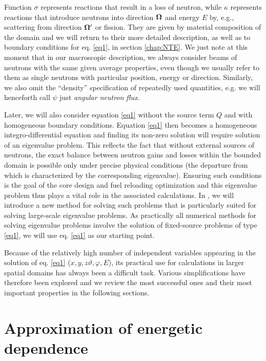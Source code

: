 Function $\sigma$ represents reactions that result in a loss of neutron, while $\kappa$ represents reactions that
introduce neutrons into direction $\mathbf{\Omega}$ and energy $E$ by, e.g., scattering from direction $\mathbf{\Omega}'$ or fission. 
They are given by material composition of the domain and we will return to their more detailed description, as
well as to boundary conditions for eq. \eqref{eq1}, in section \ref{chap:NTE}. We just note at this moment that in our macroscopic
description, we always consider beams of neutrons with the same given average properties, even though we usually refer
to them as single neutrons with particular position, energy or direction. Similarly, we also omit the ``density''
specification of repeatedly used quantities, e.g. we will henceforth call $\psi$ just \textit{angular neutron flux}.

Later, we will also consider equation \eqref{eq1} without the source term $Q$ and with homogeneous boundary conditions.
Equation \eqref{eq1} then becomes a homogeneous integro-differential equation and finding its non-zero
solution will require solution of an eigenvalue problem. This reflects the fact that without external sources of neutrons, the exact balance between neutron gains and
losses within the bounded domain is possible only under precise physical conditions (the departure from which is
characterized by the corresponding eigenvalue). Ensuring such conditions is the goal of the core design and fuel
reloading optimization and this eigenvalue problem thus plays a vital role in the associated calculations. In
, we will introduce a new method for solving such problems that is particularly suited for solving
large-scale eigenvalue problems. As practically all numerical methods for solving eigenvalue problems involve the
solution of fixed-source problems of type \eqref{eq1}, we will use eq. \eqref{eq1} as our starting point.

Because of the relatively high number of independent variables appearing in the solution of eq. \eqref{eq1}
($x,y,z\vartheta,\varphi,E$), its practical use for calculations in larger spatial domains has always been a difficult
task. Various simplifications have therefore been explored and we review the most successful ones and their most
important properties in the following sections.

\section{Approximation of energetic dependence}

